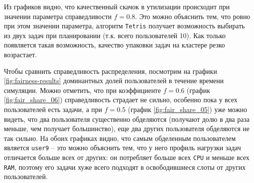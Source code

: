 Из графиков видно, что качественный скачок в утилизации происходит при значении параметра справедливости $f = 0.8$. Это можно объяснить тем, что ровно при этом значении параметра, алгоритм \texttt{Tetris} получает возможность выбирать из двух задач при планировании (т.к. всего пользователей 10). Как только появляется такая возможность, качество упаковки задач на кластере резко возрастает. 

Чтобы сравнить справедливость распределения, посмотрим на графики \ref{fig:fairness-results} доминантных долей пользователей в течение времени симуляции. Можно отметить, что при коэффициенте $f = 0.6$ (график \ref{fig:fair_share_06}) справедливость страдает не сильно, особенно пока у всех пользователей есть задачи, а при $f = 0.5$ (график \ref{fig:fair_share_05}) уже можно видеть, что два пользователя существенно обделяются (получают долю в два раза меньше, чем получает большинство), еще два других пользователя обделяются не так сильно.  На обоих графиках видно, что самым обделенным пользователем является \texttt{user9} -- это можно объяснить тем, что у него профиль нагрузки задач отличается больше всех от других: он потребляет больше всех \texttt{CPU} и меньше всех \texttt{RAM}, поэтому его задачи хуже всего подходят в освободившиеся слоты от других пользователей. 


